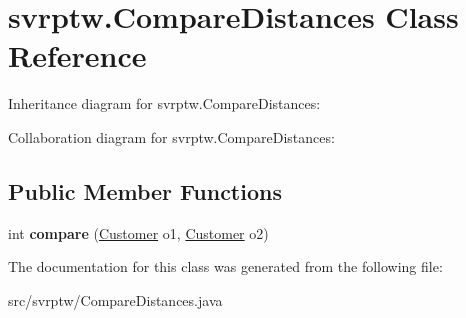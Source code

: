 \hypertarget{classsvrptw_1_1_compare_distances}{}\section{svrptw.\+Compare\+Distances Class Reference}
\label{classsvrptw_1_1_compare_distances}


Inheritance diagram for svrptw.\+Compare\+Distances\+:


Collaboration diagram for svrptw.\+Compare\+Distances\+:
\subsection*{Public Member Functions}
\begin{DoxyCompactItemize}
\item 
int {\bfseries compare} (\hyperlink{classsvrptw_1_1_customer}{Customer} o1, \hyperlink{classsvrptw_1_1_customer}{Customer} o2)\hypertarget{classsvrptw_1_1_compare_distances_ae63e3b470df7e0a258e4086c7109279b}{}\label{classsvrptw_1_1_compare_distances_ae63e3b470df7e0a258e4086c7109279b}

\end{DoxyCompactItemize}


The documentation for this class was generated from the following file\+:\begin{DoxyCompactItemize}
\item 
src/svrptw/Compare\+Distances.\+java\end{DoxyCompactItemize}
